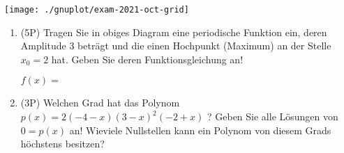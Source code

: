 \begin{center}
	\texttt{[image: ./gnuplot/exam-2021-oct-grid]}
\end{center}

\begin{enumerate}[label=(\alph*)]

	\item (5P) Tragen Sie in obiges Diagram eine periodische Funktion ein, deren Amplitude $3$ beträgt und die einen Hochpunkt (Maximum) an der Stelle $x_0=2$ hat. Geben Sie deren Funktionsgleichung an!

		\bigskip
		\bigskip

	$f(x) =$

		\bigskip
		\bigskip
	
	\item (3P) Welchen Grad hat das Polynom $p(x) = 2 (-4-x)(3-x)^2(-2+x)$ ? Geben Sie alle Lösungen von $0=p(x)$ an! Wieviele Nullstellen kann ein Polynom von diesem Grads höchstens besitzen?
	
\end{enumerate}
